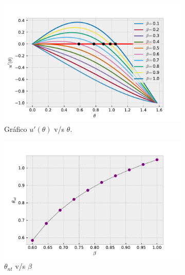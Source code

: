 \documentclass[../portafolio.tex]{subfiles}
\begin{document}
\begin{figure}[H]
    \centering
    \begin{subfigure}[b]{0.49\textwidth}
        \centering
        \includegraphics[width=\textwidth]{tex/img/graficoo.pdf}
        \caption{Gráfico $u'(\theta)$ v/s $\theta$.}
        \label{cerosfun}
    \end{subfigure}
    \hfill
    \begin{subfigure}[b]{0.49\textwidth}
         \centering
         \includegraphics[width=\textwidth]{tex/img/graf_ejc.pdf}
         \caption{$\theta_{nt}$ v/s $\beta$}
         \label{ejc_graf}
     \end{subfigure}
    \caption{}
    \label{}
\end{figure}
\end{document}
